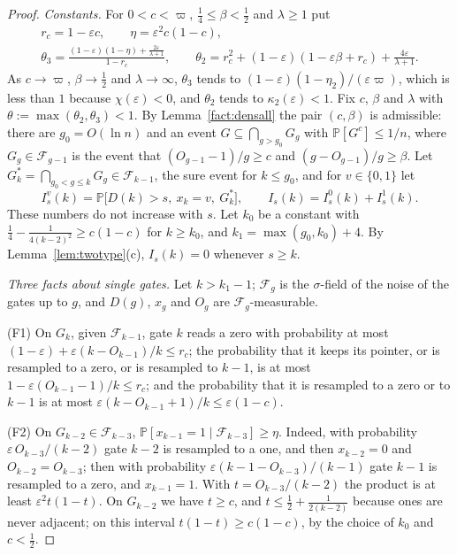 \documentclass[11pt]{amsart}
\theoremstyle{definition}
\theoremstyle{remark}
\newcommand{\eps}{\varepsilon}
\newcommand{\PP}{\mathbb{P}}
\newcommand{\cF}{\mathcal{F}}
\begin{document}
\begin{proof}
\emph{Constants.} For $0<c<\varpi$, $\frac14\le\beta<\frac12$ and $\lambda\ge1$ put
\begin{gather*}
r_c=1-\eps c,\qquad\eta=\eps^2c(1-c),\\
\theta_3=\frac{(1-\eps)(1-\eta)+\frac{2\eps}{\lambda+1}}{1-r_c},\qquad
\theta_2=r_c^2+(1-\eps)(1-\eps\beta+r_c)+\frac{4\eps}{\lambda+1}.
\end{gather*}
As $c\to\varpi$, $\beta\to\frac12$ and $\lambda\to\infty$, $\theta_3$ tends to
$(1-\eps)(1-\eta_2)/(\eps\varpi)$, which is less than $1$ because $\chi(\eps)<0$, and $\theta_2$
tends to $\kappa_2(\eps)<1$. Fix $c$, $\beta$ and $\lambda$ with $\theta:=\max(\theta_2,\theta_3)<1$.
By Lemma~\ref{fact:densall} the pair $(c,\beta)$ is admissible: there are $g_0=O(\ln n)$ and an
event $G\subseteq\bigcap_{g>g_0}G_g$ with $\PP[G^c]\le1/n$, where $G_g\in\cF_{g-1}$ is the event that
$(O_{g-1}-1)/g\ge c$ and $(g-O_{g-1})/g\ge\beta$. Let $G^*_k=\bigcap_{g_0<g\le k}G_g\in\cF_{k-1}$,
the sure event for $k\le g_0$, and for $v\in\{0,1\}$ let
\[
I^v_s(k)=\PP\bigl[D(k)>s,\ x_k=v,\ G^*_k\bigr],\qquad I_s(k)=I^0_s(k)+I^1_s(k).
\]
These numbers do not increase with $s$. Let $k_0$ be a constant with
$\frac14-\frac1{4(k-2)^2}\ge c(1-c)$ for $k\ge k_0$, and $k_1=\max(g_0,k_0)+4$. By
Lemma~\ref{lem:twotype}(c), $I_s(k)=0$ whenever $s\ge k$.

\emph{Three facts about single gates.} Let $k>k_1-1$; $\cF_g$ is the $\sigma$-field of the noise
of the gates up to $g$, and $D(g)$, $x_g$ and $O_g$ are $\cF_g$-measurable.

(F1) On $G_k$, given $\cF_{k-1}$, gate $k$ reads a zero with probability at most
$(1-\eps)+\eps(k-O_{k-1})/k\le r_c$; the probability that it keeps its pointer, or is resampled
to a zero, or is resampled to $k-1$, is at most $1-\eps(O_{k-1}-1)/k\le r_c$; and the probability
that it is resampled to a zero or to $k-1$ is at most $\eps(k-O_{k-1}+1)/k\le\eps(1-c)$.

(F2) On $G_{k-2}\in\cF_{k-3}$, $\PP[x_{k-1}=1\mid\cF_{k-3}]\ge\eta$. Indeed, with probability
$\eps\,O_{k-3}/(k-2)$ gate $k-2$ is resampled to a one, and then $x_{k-2}=0$ and
$O_{k-2}=O_{k-3}$; then with probability $\eps(k-1-O_{k-3})/(k-1)$ gate $k-1$ is resampled to a
zero, and $x_{k-1}=1$. With $t=O_{k-3}/(k-2)$ the product is at least $\eps^2t(1-t)$. On $G_{k-2}$
we have $t\ge c$, and $t\le\frac12+\frac1{2(k-2)}$ because ones are never adjacent; on this
interval $t(1-t)\ge c(1-c)$, by the choice of $k_0$ and $c<\frac12$.


\end{proof}
\end{document}
